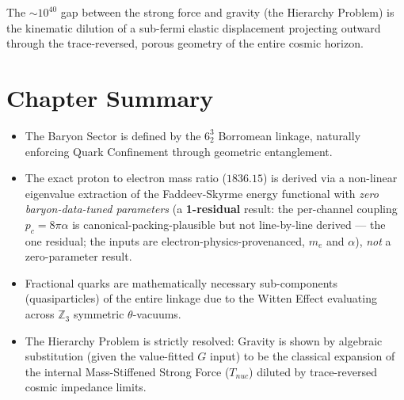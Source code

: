 The $\sim 10^{40}$ gap between the strong force and gravity (the Hierarchy Problem) is the kinematic dilution of a sub-fermi elastic displacement projecting outward through the trace-reversed, porous geometry of the entire cosmic horizon.

\section*{Chapter Summary}
\begin{itemize}
    \item The Baryon Sector is defined by the $6^3_2$ Borromean linkage, naturally enforcing Quark Confinement through geometric entanglement.
    \item The exact proton to electron mass ratio ($1836.15$) is derived via a non-linear eigenvalue extraction of the Faddeev-Skyrme energy functional with \emph{zero baryon-data-tuned parameters} (a \textbf{1-residual} result: the per-channel coupling $p_c = 8\pi\alpha$ is canonical-packing-plausible but not line-by-line derived --- the one residual; the inputs are electron-physics-provenanced, $m_e$ and $\alpha$), \emph{not} a zero-parameter result.
    \item Fractional quarks are mathematically necessary sub-components (quasiparticles) of the entire linkage due to the Witten Effect evaluating across $\mathbb{Z}_3$ symmetric $\theta$-vacuums.
    \item The Hierarchy Problem is strictly resolved: Gravity is shown by algebraic substitution (given the value-fitted $G$ input) to be the classical expansion of the internal Mass-Stiffened Strong Force ($T_{nuc}$) diluted by trace-reversed cosmic impedance limits.
\end{itemize}

